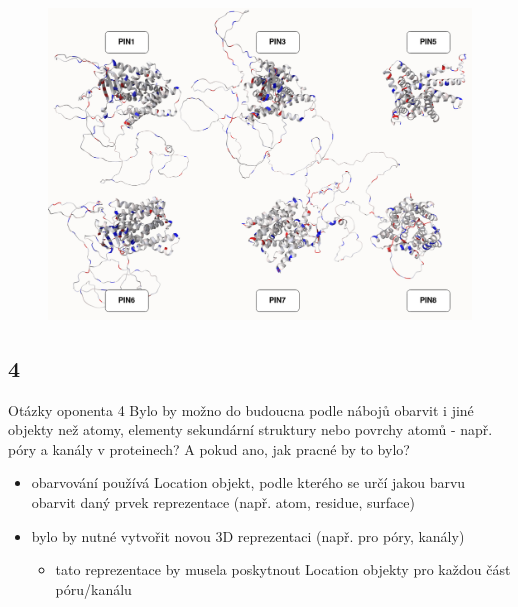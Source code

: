 \documentclass[
]{beamer}
\begin{document}
\begin{frame}{}
  \begin{figure}
    \includegraphics[width=1\textwidth,height=\textheight,keepaspectratio]{images/pins2.png}
  \end{figure}
\end{frame}

\subsection[4]{4}

\begin{frame}
  \begin{block}{Otázky oponenta 4}
    Bylo by možno do budoucna podle nábojů obarvit i jiné objekty než atomy, elementy sekundární struktury nebo povrchy atomů - např. póry a kanály v proteinech? A pokud ano, jak pracné by to bylo?
  \end{block}
  \begin{itemize}
    \item obarvování používá Location objekt, podle kterého se určí jakou barvu obarvit daný prvek reprezentace (např. atom, residue, surface)
    \item bylo by nutné vytvořit novou 3D reprezentaci (např. pro póry, kanály)
    \begin{itemize}
      \item tato reprezentace by musela poskytnout Location objekty pro každou část póru/kanálu
    \end{itemize}
  \end{itemize}
\end{frame}
\end{document}

